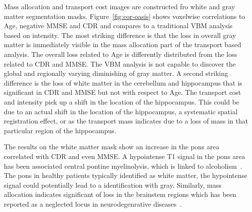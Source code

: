 \documentclass{llncs}
\begin{document}
Mass allocation and transport cost images are constructed fro white and gray
matter segmentation masks. Figure~\ref{fig:cor-oasis} shows voxelwise
correlations to Age, negative MMSE and CDR and compares to a traditional VBM
analysis based on intensity. The most striking difference is that the loss in
overall gray matter is immediately visible in the mass allocation part of the
transport based analysis. The overall loss related to Age is differently
distributed from the loss related to CDR and MMSE. The VBM analysis is not
capable to discover the global and regionally varying diminishing of gray
matter. A second striking difference is the loss of white matter in the
cerebellum and hippocampus that is significant in CDR and MMSE but not with
respect to Age.  The transport cost and intensity pick up a shift in the
location of the hippocampus. This could be due to an actual shift in the
location of the hippocampus, a systematic spatial registration effect, or as
the transport mass indicates due to a loss of mass in that particular region of
the hippocampus.

The results on the white matter mask show an increase in the pons area
correlated with CDR and even MMSE.  A hypointense  T1 signal in the pons area
has been associated central pontine myelinolysis, which is linked to
alcoholism~\citep{quach2014early}. The pons in healthy patients typically
identified as white matter, the hypointense signal could potentially lead to a
identification with gray. Similarly, mass allocation indicates significant of
loss in the brainstem regions which has been reported as a neglected locus in
neurodegenrative diseases~\citep{grinberg2011brainstem}.  
\end{document}
